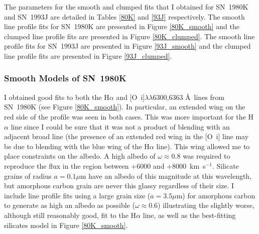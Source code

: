 The parameters for the smooth and clumped fits  that I obtained for SN~1980K and SN~1993J are detailed in Tables \ref{80K} and \ref{93J} respectively. The smooth line profile fits for SN~1980K are presented in Figure \ref{80K_smooth} and the clumped line profile fits are presented in Figure \ref{80K_clumped}.  The smooth line profile fits for SN~1993J are presented in Figure \ref{93J_smooth} and the clumped line profile fits are presented in Figure \ref{93J_clumped}.  

\subsubsection{Smooth Models of SN~1980K}

I obtained good fits to both the H$\alpha$ and [O~{\sc i}]$\lambda\lambda$6300,6363 \AA\  lines from SN~1980K (see Figure \ref{80K_smooth}).  In particular, an extended wing on the red side of the profile was seen in both cases. This was more important for the H$\alpha$ line since I could be sure that it was not a product of blending with an adjacent broad line (the presence of an extended red wing in the [O~{\sc i}] line may be due to blending with the blue wing of the H$\alpha$ line).  This wing allowed me to place constraints on the albedo.  A high albedo of $\omega\approx0.8$  was required to reproduce the flux in the region between $+6000$ and $+8000$~km~s$^{-1}$.  Silicate grains of radius $a=0.1\mu$m have an albedo of this magnitude at this wavelength, but amorphous carbon grain are never this glassy regardless of their size.  I include line profile fits using a large grain size ($a=3.5\mu$m) for amorphous carbon to generate as high an albedo as possible ($\omega\approx0.6$) illustrating the slightly worse, although still reasonably good, fit to the H$\alpha$ line, as well as the best-fitting silicates model in Figure \ref{80K_smooth}.  

